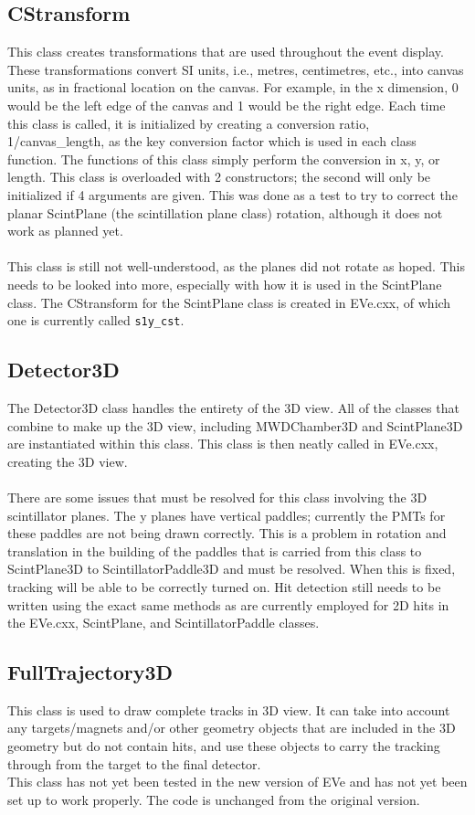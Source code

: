 \documentclass[12pt]{article}
\numberwithin{equation}{section}
\begin{document}
\subsection{CStransform}
This class creates transformations that are used throughout the event display. These transformations convert SI units, i.e., metres, centimetres, etc., into canvas units, as in fractional location on the canvas. For example, in the x dimension, 0 would be the left edge of the canvas and 1 would be the right edge. Each time this class is called, it is initialized by creating a conversion ratio, 1/canvas\_length, as the key conversion factor which is used in each class function. The functions of this class simply perform the conversion in x, y, or length. This class is overloaded with 2 constructors; the second will only be initialized if 4 arguments are given. This was done as a test to try to correct the planar ScintPlane (the scintillation plane class) rotation, although it does not work as planned yet. 
\\
\\
This class is still not well-understood, as the planes did not rotate as hoped. This needs to be looked into more, especially with how it is used in the ScintPlane class. The CStransform for the ScintPlane class is created in EVe.cxx, of which one is currently called \texttt{s1y\_cst}.

\subsection{Detector3D}
The Detector3D class handles the entirety of the 3D view. All of the classes that combine to make up the 3D view, including MWDChamber3D and ScintPlane3D are instantiated within this class. This class is then neatly called in EVe.cxx, creating the 3D view.
\\
\\
There are some issues that must be resolved for this class involving the 3D scintillator planes. The y planes have vertical paddles; currently the PMTs for these paddles are not being drawn correctly. This is a problem in rotation and translation in the building of the paddles that is carried from this class to ScintPlane3D to ScintillatorPaddle3D and must be resolved. When this is fixed, tracking will be able to be correctly turned on. Hit detection still needs to be written using the exact same methods as are currently employed for 2D hits in the EVe.cxx, ScintPlane, and ScintillatorPaddle classes.

\subsection{FullTrajectory3D}
This class is used to draw complete tracks in 3D view. It can take into account any targets/magnets and/or other geometry objects that are included in the 3D geometry but do not contain hits, and use these objects to carry the tracking through from the target to the final detector.
\\
This class has not yet been tested in the new version of EVe and has not yet been set up to work properly. The code is unchanged from the original version.
\end{document}
